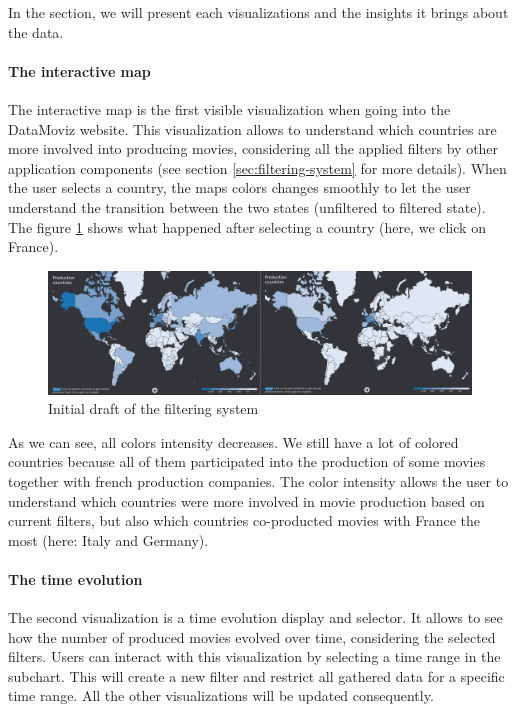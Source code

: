 \documentclass[a4paper,10pt]{article}
\begin{document}
In the section, we will present each visualizations and the insights it brings about
the data.

\paragraph{The interactive map} The interactive map is the first visible visualization
when going into the DataMoviz website. This visualization allows to understand which
countries are more involved into producing movies, considering all the applied filters
by other application components (see section \ref{sec:filtering-system} for more details).
When the user selects a country, the maps colors changes smoothly to let the user understand
the transition between the two states (unfiltered to filtered state). The figure \ref{fig:country-selection}
shows what happened after selecting a country (here, we click on France).

\begin{figure}[ht]
  \centering
  \includegraphics[width=1\linewidth]{images/screens/country-selection.png}
  \caption{Initial draft of the filtering system} \label{fig:country-selection}
\end{figure}

As we can see, all colors intensity decreases. We still have a lot of colored countries
because all of them participated into the production of some movies together with
french production companies. The color intensity allows the user to understand which
countries were more involved in movie production based on current filters, but also
which countries co-producted movies with France the most (here: Italy and Germany).

\paragraph{The time evolution}

The second visualization is a time evolution display and selector. It allows to
see how the number of produced movies evolved over time, considering the selected
filters. Users can interact with this visualization by selecting a time range in the
subchart. This will create a new filter and restrict all gathered data for a specific
time range. All the other visualizations will be updated consequently.
\end{document}
